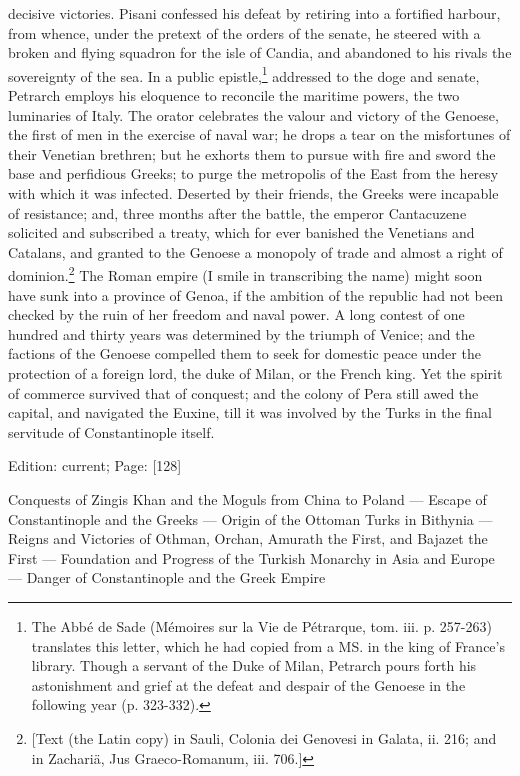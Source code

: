decisive victories. Pisani confessed his defeat by retiring into a fortified harbour, from whence, under the pretext of the orders of the senate, he steered with a broken and flying squadron for the isle of Candia, and abandoned to his rivals the sovereignty of the sea. In a public epistle,\footnote{The Abbé de Sade (Mémoires sur la Vie de Pétrarque, tom. iii. p. 257-263) translates this letter, which he had copied from a MS. in the king of France\texthebrew{}’s library. Though a servant of the Duke of Milan, Petrarch pours forth his astonishment and grief at the defeat and despair of the Genoese in the following year (p. 323-332).} addressed to the doge and senate, Petrarch employs his eloquence to reconcile the maritime powers, the two luminaries of Italy. The orator celebrates the valour and victory of the Genoese, the first of men in the exercise of naval war; he drops a tear on the misfortunes of their Venetian brethren; but he exhorts them to pursue with fire and sword the base and perfidious Greeks; to purge the metropolis of the East from the heresy with which it was infected. Deserted by their friends, the Greeks were incapable of resistance; and, three months after the battle, the emperor Cantacuzene solicited and subscribed a treaty, which for ever banished the Venetians and Catalans, and granted to the Genoese a monopoly of trade and almost a right of dominion.\footnote{[Text (the Latin copy) in Sauli, Colonia dei Genovesi in Galata, ii. 216; and in Zachariä, Jus Graeco-Romanum, iii. 706.]} The Roman empire (I smile in transcribing the name) might soon have sunk into a province of Genoa, if the ambition of the republic had not been checked by the ruin of her freedom and naval power. A long contest of one hundred and thirty years was determined by the triumph of Venice; and the factions of the Genoese compelled them to seek for domestic peace under the protection of a foreign lord, the duke of Milan, or the French king. Yet the spirit of commerce survived that of conquest; and the colony of Pera still awed the capital, and navigated the Euxine, till it was involved by the Turks in the final servitude of Constantinople itself.

Edition: current; Page: [128]


Conquests of Zingis Khan and the Moguls from China to Poland \texthebrew{—} Escape of Constantinople and the Greeks \texthebrew{—} Origin of the Ottoman Turks in Bithynia \texthebrew{—} Reigns and Victories of Othman, Orchan, Amurath the First, and Bajazet the First \texthebrew{—} Foundation and Progress of the Turkish Monarchy in Asia and Europe \texthebrew{—} Danger of Constantinople and the Greek Empire

